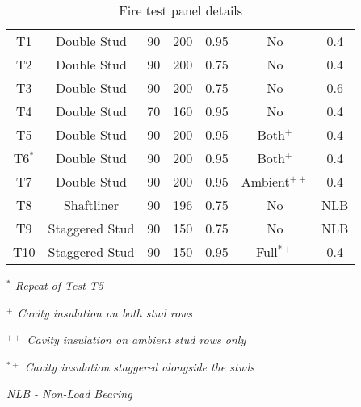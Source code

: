 \begin{table}[!htbp]
	\begin{threeparttable}
		\centering
			\caption{Fire test panel details}
				\begin{tabular}{ccccccc}
					\toprule
					\multicolumn{1}{m{2.4em}}{\centering{Test Name}} & 
					\multicolumn{1}{m{5.6em}}{\centering{Description}} & 
					\multicolumn{1}{m{2.85em}}{\centering{Stud Depth (mm)}} & 
					\multicolumn{1}{m{2.85em}}{\centering{Cavity Depth (mm)}} & 
					\multicolumn{1}{m{5em}}{\centering{Stud Thickness (mm)}} & 
					\multicolumn{1}{m{5em}}{\centering{Cavity Insulation}} &
					\multicolumn{1}{m{3em}}{\centering{Loading Ratio}}\\
					\midrule
					T1  & Double Stud & 90 & 200 & 0.95 & No & 0.4 \\
					T2  & Double Stud & 90 & 200 & 0.75 & No & 0.4 \\
					T3  & Double Stud & 90 & 200 & 0.75 & No & 0.6 \\
					T4  & Double Stud & 70 & 160 & 0.95 & No & 0.4 \\
					T5  & Double Stud & 90 & 200 & 0.95 & Both\(^+\) & 0.4 \\
					T6\(^*\)  & Double Stud & 90 & 200 & 0.95 & Both\(^+\) & 0.4 \\
					T7  & Double Stud & 90 & 200 & 0.95 & Ambient\(^{++}\) & 0.4 \\
					T8  & Shaftliner & 90 & 196 & 0.75 & No & NLB\\
					T9  & Staggered Stud & 90 & 150 & 0.75 & No & NLB\\
					T10  & Staggered Stud & 90 & 150 & 0.95 & Full\(^{*+}\) & 0.4 \\
					\bottomrule
				\end{tabular}%
				\label{tab:test-specimens}%
					\begin{tablenotes}
						\small
						\item \textit{\(^*\) Repeat of Test-T5}
						\item \textit{\(^+\) Cavity insulation on both stud rows}
						\item \textit{\(^{++}\) Cavity insulation on ambient stud rows only}
						\item \textit{\(^{*+}\) Cavity insulation staggered alongside the studs}
						\item \textit{NLB - Non-Load Bearing}
					\end{tablenotes}
		\end{threeparttable}
\end{table}%
